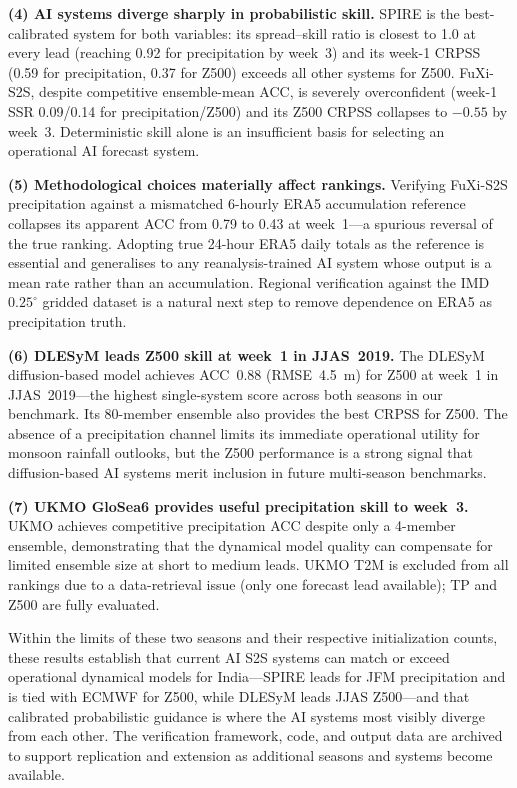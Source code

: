 \documentclass[11pt,a4paper]{article}
\begin{document}
\textbf{(4) AI systems diverge sharply in probabilistic skill.}
SPIRE is the best-calibrated system for both variables: its
spread--skill ratio is closest to 1.0 at every lead (reaching 0.92 for
precipitation by week~3) and its week-1 CRPSS (0.59 for precipitation,
0.37 for Z500) exceeds all other systems for Z500. FuXi-S2S, despite
competitive ensemble-mean ACC, is severely overconfident (week-1 SSR
0.09/0.14 for precipitation/Z500) and its Z500 CRPSS collapses to
$-0.55$ by week~3. Deterministic skill alone is an insufficient basis
for selecting an operational AI forecast system.

\textbf{(5) Methodological choices materially affect rankings.}
Verifying FuXi-S2S precipitation against a mismatched 6-hourly ERA5
accumulation reference collapses its apparent ACC from 0.79 to 0.43 at
week~1---a spurious reversal of the true ranking. Adopting true 24-hour
ERA5 daily totals as the reference is essential and generalises to any
reanalysis-trained AI system whose output is a mean rate rather than an
accumulation. Regional verification against the IMD $0.25^\circ$ gridded
dataset \citep{pai2014} is a natural next step to remove dependence on
ERA5 as precipitation truth.

\textbf{(6) DLESyM leads Z500 skill at week~1 in JJAS~2019.}
The DLESyM diffusion-based model achieves ACC~0.88 (RMSE~4.5~m) for Z500 at
week~1 in JJAS~2019---the highest single-system score across both seasons in our
benchmark. Its 80-member ensemble also provides the best CRPSS for Z500.
The absence of a precipitation channel limits its immediate operational utility for
monsoon rainfall outlooks, but the Z500 performance is a strong signal that
diffusion-based AI systems merit inclusion in future multi-season benchmarks.

\textbf{(7) UKMO GloSea6 provides useful precipitation skill to week~3.}
UKMO achieves competitive precipitation ACC despite only a 4-member ensemble,
demonstrating that the dynamical model quality can compensate for limited
ensemble size at short to medium leads. UKMO T2M is excluded from all rankings
due to a data-retrieval issue (only one forecast lead available); TP and Z500
are fully evaluated.

Within the limits of these two seasons and their respective initialization counts,
these results establish that current AI S2S systems can match or exceed
operational dynamical models for India---SPIRE leads for JFM precipitation
and is tied with ECMWF for Z500, while DLESyM leads JJAS Z500---and that
calibrated probabilistic guidance is where the AI systems most visibly diverge
from each other. The verification framework, code, and output data are archived
to support replication and extension as additional seasons and systems become
available.
\end{document}
